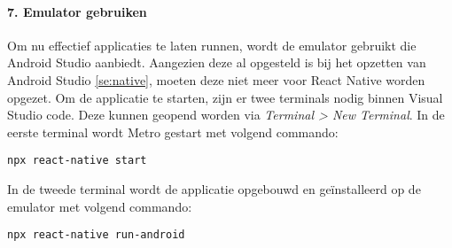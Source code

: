 \paragraph{7. Emulator gebruiken} \label{par:emulatorgebruiken}
Om nu effectief applicaties te laten runnen, wordt de emulator gebruikt die Android Studio aanbiedt. 
Aangezien deze al opgesteld is bij het opzetten van Android Studio \ref{se:native}, 
moeten deze niet meer voor React Native worden opgezet. Om de applicatie te starten, zijn er twee terminals nodig 
binnen Visual Studio code. Deze kunnen geopend worden via \textit{Terminal > New Terminal}. 
In de eerste terminal wordt \Gls{Metro} gestart met volgend commando:
\begin{verbatim}
npx react-native start
\end{verbatim}
In de tweede terminal wordt de applicatie opgebouwd en geïnstalleerd op de emulator met volgend commando:
\begin{verbatim}
npx react-native run-android
\end{verbatim}

